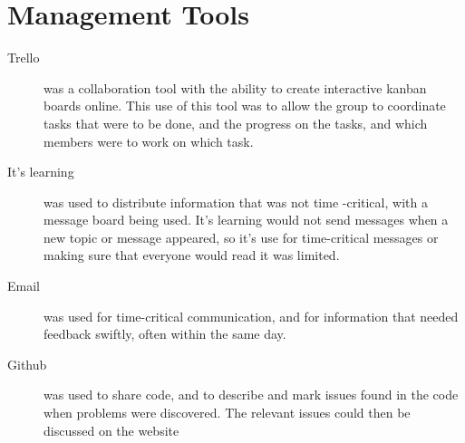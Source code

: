 \section{Management Tools}
 
\begin{description}
\item[Trello] was a collaboration tool with the ability to create interactive kanban boards online. This use of this tool was to allow the group to coordinate tasks that were to be done, and the progress on the tasks, and which members were to work on which task. 
\item[It's learning] was used to distribute information that was not time -critical, with a message board being used. It's learning would not send messages when a new topic or message appeared, so it's use for time-critical messages or making sure that everyone would read it was limited. 
\item[Email] was used for time-critical communication, and for information that needed feedback swiftly, often within the same day.
\item[Github] was used to share code, and to describe and mark issues found in the code when problems were discovered. The relevant issues could then be discussed on the website
\end{description}